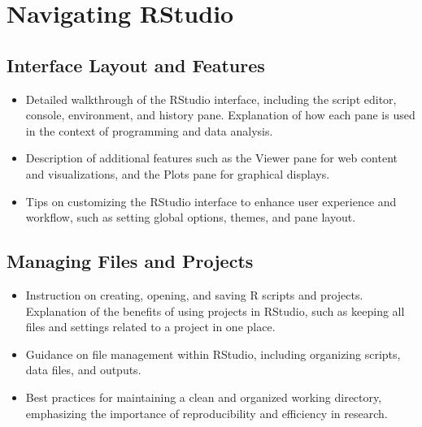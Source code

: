 \documentclass[
]{book}
\begin{document}
\hypertarget{navigating-rstudio}{%
\section*{Navigating RStudio}\label{navigating-rstudio}}

\hypertarget{interface-layout-and-features}{%
\subsection*{Interface Layout and Features}\label{interface-layout-and-features}}

\begin{itemize}
\item
  Detailed walkthrough of the RStudio interface, including the script editor, console, environment, and history pane. Explanation of how each pane is used in the context of programming and data analysis.
\item
  Description of additional features such as the Viewer pane for web content and visualizations, and the Plots pane for graphical displays.
\item
  Tips on customizing the RStudio interface to enhance user experience and workflow, such as setting global options, themes, and pane layout.
\end{itemize}

\hypertarget{managing-files-and-projects}{%
\subsection*{Managing Files and Projects}\label{managing-files-and-projects}}

\begin{itemize}
\item
  Instruction on creating, opening, and saving R scripts and projects. Explanation of the benefits of using projects in RStudio, such as keeping all files and settings related to a project in one place.
\item
  Guidance on file management within RStudio, including organizing scripts, data files, and outputs.
\item
  Best practices for maintaining a clean and organized working directory, emphasizing the importance of reproducibility and efficiency in research.
\end{itemize}
\end{document}
